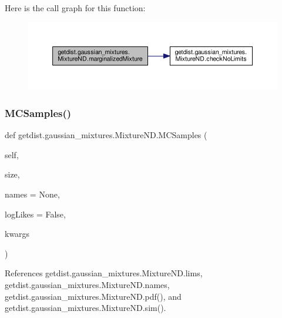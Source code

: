 Here is the call graph for this function\+:
\nopagebreak
\begin{figure}[H]
\begin{center}
\leavevmode
\includegraphics[width=350pt]{classgetdist_1_1gaussian__mixtures_1_1MixtureND_a9336c58f7855163a171ea12a4d4bdbd1_cgraph}
\end{center}
\end{figure}
\mbox{\label{classgetdist_1_1gaussian__mixtures_1_1MixtureND_aa21545c325ae1162596655b4f4425acb}} 
\subsubsection{\texorpdfstring{M\+C\+Samples()}{MCSamples()}}
{\footnotesize\ttfamily def getdist.\+gaussian\+\_\+mixtures.\+Mixture\+N\+D.\+M\+C\+Samples (\begin{DoxyParamCaption}\item[{}]{self,  }\item[{}]{size,  }\item[{}]{names = {\ttfamily None},  }\item[{}]{log\+Likes = {\ttfamily False},  }\item[{}]{kwargs }\end{DoxyParamCaption})}



References getdist.\+gaussian\+\_\+mixtures.\+Mixture\+N\+D.\+lims, getdist.\+gaussian\+\_\+mixtures.\+Mixture\+N\+D.\+names, getdist.\+gaussian\+\_\+mixtures.\+Mixture\+N\+D.\+pdf(), and getdist.\+gaussian\+\_\+mixtures.\+Mixture\+N\+D.\+sim().

